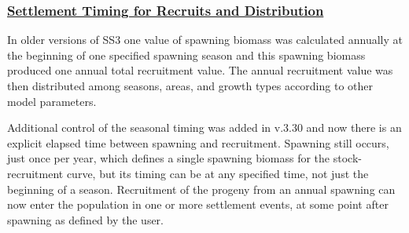 \hypertarget{SettlementTiming}{}
\subsubsection[Settlement Timing for Recruits and Distribution]{\protect\hyperlink{SettlementTiming}{Settlement Timing for Recruits and Distribution}}
In older versions of SS3 one value of spawning biomass was calculated annually at the beginning of one specified spawning season and this spawning biomass produced one annual total recruitment value. The annual recruitment value was then distributed among seasons, areas, and growth types according to other model parameters.

Additional control of the seasonal timing was added in v.3.30 and now there is an explicit elapsed time between spawning and recruitment. Spawning still occurs, just once per year, which defines a single spawning biomass for the stock-recruitment curve, but its timing can be at any specified time, not just the beginning of a season. Recruitment of the progeny from an annual spawning can now enter the population in one or more settlement events, at some point after spawning as defined by the user.

